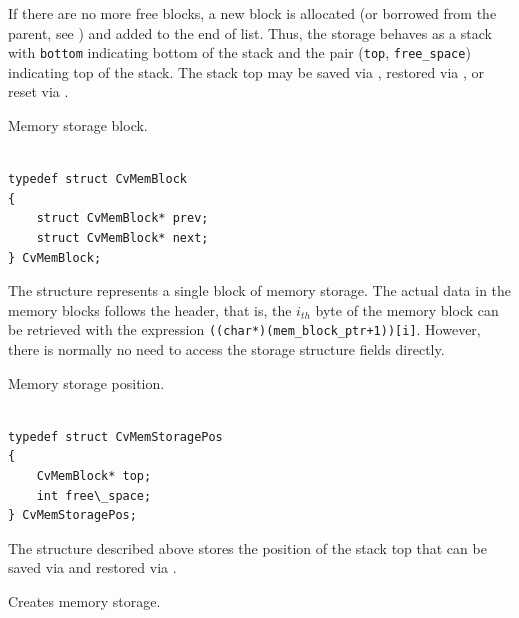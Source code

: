 If there are no more free blocks, a new block is allocated (or borrowed
from the parent, see ) and added to the end of
list. Thus, the storage behaves as a stack with \texttt{bottom} indicating
bottom of the stack and the pair (\texttt{top}, \texttt{free\_space})
indicating top of the stack. The stack top may be saved via
, restored via ,
or reset via .

\label{CvMemBlock}

Memory storage block.

\begin{lstlisting}

typedef struct CvMemBlock
{
    struct CvMemBlock* prev;
    struct CvMemBlock* next;
} CvMemBlock;

\end{lstlisting}

The structure  represents a single block of memory
storage. The actual data in the memory blocks follows the header, that is,
the $i_{th}$ byte of the memory block can be retrieved with the expression
\texttt{((char*)(mem\_block\_ptr+1))[i]}. However, there is normally no need
to access the storage structure fields directly.

\label{CvMemStoragePos}

Memory storage position.

\begin{lstlisting}

typedef struct CvMemStoragePos
{
    CvMemBlock* top;
    int free\_space;
} CvMemStoragePos;

\end{lstlisting}

The structure described above stores the position of the stack top that can be saved via  and restored via .

\label{CreateMemStorage}

Creates memory storage.


\begin{description}
\end{description}

